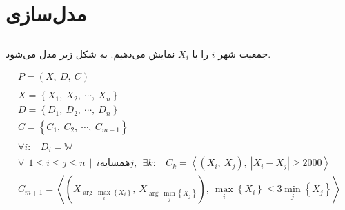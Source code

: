 \documentclass{article}
\begin{document}
\section{مدل‌سازی}
\subsection{}
جمعیت شهر $i$ را با $X_{i}$ نمایش می‌دهیم.  به شکل زیر مدل می‌شود.\\
\begin{fleqn}
\begin{equation}
\begin{aligned}
P = (X,\:D,\:C) \\ \\
X = \left\{ X_{1},\:X_{2},\:\cdots ,\:X_{n} \right\} \\
D = \left\{ D_{1},\:D_{2},\:\cdots ,\:D_{n} \right\} \\
C = \left\{ C_{1},\:C_{2},\:\cdots ,\:C_{m+1} \right\} \\ \\
\forall i:\:\:\:\:D_{i} = \mathbb{W} \\
\forall \:\: 1 \le i \leq j \le n \:\: | \:\: i \text{همسایه} j, \:\: \exists k: \:\:\:\:C_{k} = \left\langle \left( X_{i},\:X_{j} \right),\: \left| X_{i} - X_{j} \right| \ge 2000 \right\rangle\\
C_{m+1} = \left\langle \left( X_{\arg\: \max_{i}\left\{ X_{i} \right\}},\:X_{\arg\: \min_{j}\left\{ X_{j} \right\}} \right),\: \max_{i}\left\{ X_{i} \right\} \le 3\min_{j}\left\{ X_{j} \right\} \right\rangle
\end{aligned}
\end{equation}
\end{fleqn}
\end{document}
